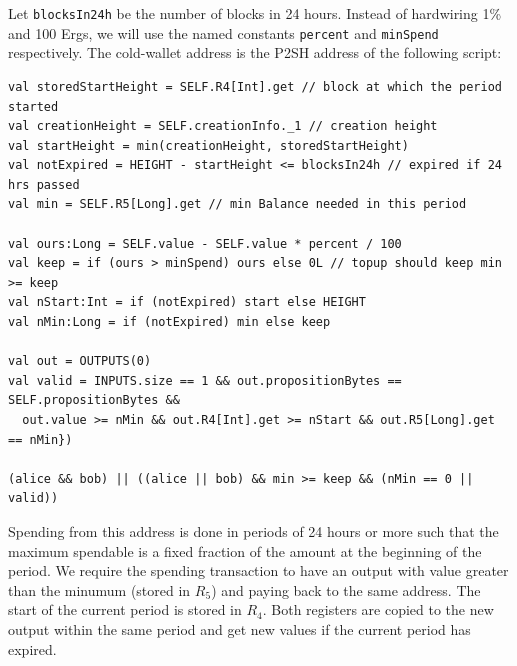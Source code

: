 \documentclass[11pt]{article}
\begin{document}
Let \texttt{blocksIn24h} be the number of blocks in 24 hours. Instead of hardwiring 1\% and 100 Ergs, we will use the named constants \texttt{percent} and \texttt{minSpend} respectively. The cold-wallet address is the P2SH address of the following script:
\begin{verbatim}
val storedStartHeight = SELF.R4[Int].get // block at which the period started
val creationHeight = SELF.creationInfo._1 // creation height
val startHeight = min(creationHeight, storedStartHeight) 
val notExpired = HEIGHT - startHeight <= blocksIn24h // expired if 24 hrs passed
val min = SELF.R5[Long].get // min Balance needed in this period

val ours:Long = SELF.value - SELF.value * percent / 100
val keep = if (ours > minSpend) ours else 0L // topup should keep min >= keep
val nStart:Int = if (notExpired) start else HEIGHT
val nMin:Long = if (notExpired) min else keep

val out = OUTPUTS(0)  
val valid = INPUTS.size == 1 && out.propositionBytes == SELF.propositionBytes &&
  out.value >= nMin && out.R4[Int].get >= nStart && out.R5[Long].get == nMin})
    
(alice && bob) || ((alice || bob) && min >= keep && (nMin == 0 || valid))
\end{verbatim}

Spending from this address is done in periods of 24 hours or more such that the maximum spendable is a fixed fraction of the amount at the beginning of the period. We require the spending transaction to have an output with value greater than the minumum (stored in $R_5$) and paying back to the same address. The start of the current period is stored in $R_4$. Both registers are copied to the new output within the same period and get new values if the current period has expired.
\end{document}
